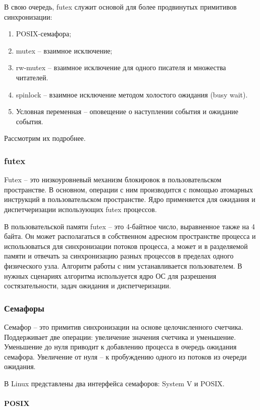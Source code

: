 В свою очередь, futex служит основой для более продвинутых примитивов синхронизации:
\begin{enumerate}
\item POSIX-семафора;
\item mutex -- взаимное исключение;
\item rw-mutex -- взаимное исключение для одного писателя и множества читателей.
\item spinlock -- взаимное исключение методом холостого ожидания (busy wait).
\item Условная переменная -- оповещение о наступлении события и ожидание события.
\end{enumerate}

Рассмотрим их подробнее.

\subsubsection{futex}

Futex \cite{FutexOrigins} -- это низкоуровневый механизм блокировок в пользовательском пространстве. В основном, операции с ним производится с помощью атомарных инструкций в пользовательском пространстве. Ядро применяется для ожидания и диспетчеризации использующих futex процессов.

В пользовательской памяти futex -- это 4-байтное число, выравненное также на 4 байта. Он может располагаться в собственном адресном пространстве процесса и использоваться для синхронизации потоков процесса, а может и в разделяемой памяти и отвечать за синхронизацию разных процессов в пределах одного физического узла. Алгоритм работы с ним устанавливается пользователем. В нужных сценариях алгоритма используется ядро ОС для разрешения состязательности, задач ожидания и диспетчеризации.

\subsubsection{Семафоры}

Семафор -- это примитив синхронизации на основе целочисленного счетчика. Поддерживает две операции: увеличение значения счетчика и уменьшение. Уменьшение до нуля приводит к добавлению процесса в очередь ожидания семафора. Увеличение от нуля -- к пробуждению одного из потоков из очереди ожидания.

В Linux представлены два интерфейса семафоров: System V и POSIX.

\paragraph{POSIX}

